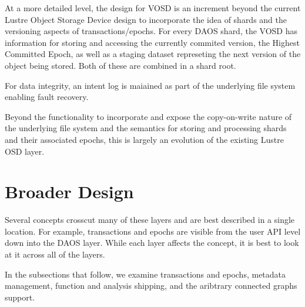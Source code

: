 \documentclass[conference]{IEEEtran}
\begin{document}
At a more detailed level, the design for VOSD is an increment beyond the
current Lustre Object Storage Device design to incorporate the idea of shards
and the versioning aspects of transactions/epochs. For every DAOS shard, the
VOSD has information for storing and accessing the currently commited version,
the Highest Committed Epoch, as well as a staging dataset represeting the
next version of the object being stored. Both of these are combined in a shard
root.

For data integrity, an intent log is maiained as part of the underlying file
system enabling fault recovery.

Beyond the functionality to incorporate and expose the copy-on-write nature
of the underlying file system and the semantics for storing and processing
shards and their associated epochs, this is largely an evolution of the
existing Lustre OSD layer.

\section{Broader Design}
\label{sec:broader}

Several concepts crosscut many of these layers and are best described in a
single location. For example, transactions and epochs are visible from the
user API level down into the DAOS layer. While each layer affects the concept,
it is best to look at it across all of the layers.

In the subsections that follow, we examine transactions and epochs, metadata
management, function and analysis shipping, and the aribtrary connected graphs
support.

%
%
\end{document}
